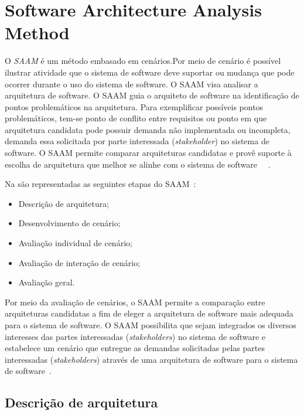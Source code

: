 \section{Software Architecture Analysis Method}
\label{sec:SAAM}
O \emph{\acrfull{SAAM}} é um método embasado em cenários.Por meio de cenário é possível ilustrar atividade que o sistema de software deve suportar ou mudança que pode ocorrer durante o uso do sistema de software. O SAAM visa analisar a arquitetura de software. O SAAM guia o arquiteto de software na identificação de pontos problemáticos na arquitetura. Para exemplificar possíveis pontos problemáticos, tem-se ponto de conflito entre requisitos ou ponto em que arquitetura candidata pode possuir demanda não implementada ou incompleta, demanda essa solicitada por parte interessada (\emph{stakeholder}) no sistema de software. O SAAM permite comparar arquiteturas candidatas e provê suporte à escolha de arquitetura que melhor se alinhe com o sistema de software ~\cite{survey_methods}~\cite{scenario_methods}.

%

Na  são representadas as seguintes etapas do SAAM~\cite{scenario_methods}:
\begin{itemize}
    \item Descrição de arquitetura;
    \item Desenvolvimento de cenário;
    \item Avaliação individual de cenário;
    \item Avaliação de interação de cenário;
    \item Avaliação geral.
\end{itemize}

Por meio da avaliação de cenários, o SAAM permite a comparação entre  arquiteturas candidatas a fim de eleger a arquitetura de software mais adequada para o sistema de software. O SAAM possibilita que sejam integrados os diversos interesses das partes interessadas (\emph{stakeholders}) no sistema de software e estabelece um cenário que entregue as demandas solicitadas pelas partes interessadas (\emph{stakeholders}) através de uma arquitetura de software para o sistema de software~\cite{survey_methods}.

\subsection{Descrição de arquitetura}

